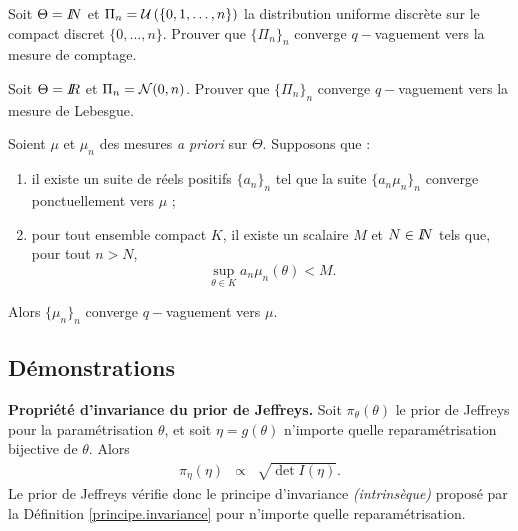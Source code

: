 \documentclass[10pt]{article}
\begin{document}
 
\fi

\begin{exec}
Soit $\Theta=I\!\!N$ et $\Pi_n= {\cal{U}}\left(\left\{0,1,\ldots,n\right\}\right)$ la distribution uniforme discrète sur le compact discret $\{0,\ldots,n\}$.  Prouver que $\{\Pi_n\}_n$ converge $q-$vaguement vers la mesure de comptage.
\end{exec}

 
\fi


\if{}  \vspace{1cm}
\begin{exec}
Soit $\Theta=I\!\!R$ et $\Pi_n= {\cal{N}}(0,n)$. Prouver que $\{\Pi_n\}_n$ converge $q-$vaguement vers la mesure de Lebesgue.
\end{exec}

 
\fi

\begin{proposition}\label{condition.continue}
Soient $\mu$ et $\mu_n$ des mesures {\it a priori} sur $\Theta$. Supposons que :
\begin{enumerate}
\item il existe un suite de réels positifs $\{a_n\}_n$ tel que la suite $\{a_n \mu_n\}_n$ converge ponctuellement vers $\mu$ ; 
\item pour tout ensemble compact $K$, il existe un scalaire $M$ et $N\in I\!\!N$ tels que, pour tout $n>N$, 
$$
\sup_{\theta\in K} a_n \mu_n(\theta) < M.
$$
\end{enumerate}
Alors $\{\mu_n\}_n$ converge $q-$vaguement vers $\mu$.
\end{proposition}

\subsection{Démonstrations}

\if{} \vspace{1cm}
\begin{theorem}{\bf Propriété d'invariance du prior de Jeffreys.}
Soit $\pi_{\theta}(\theta)$ le prior de Jeffreys pour la paramétrisation $\theta$, et soit $\eta=g(\theta)$ n'importe quelle reparamétrisation bijective de $\theta$. Alors
\begin{eqnarray*}
\pi_{\eta}(\eta) & \propto & \sqrt{\det I({\eta})}.
\end{eqnarray*}
Le prior de Jeffreys vérifie donc le principe d'invariance {\it (intrinsèque)} proposé par la Définition \ref{principe.invariance}  pour n'importe quelle reparamétrisation.   
\end{theorem}
\end{document}

